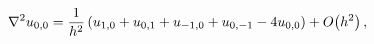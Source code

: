\[\nabla^{2}u_{0,0}=\frac{1}{h^{2}}\,(u_{1,0}+u_{0,1}+u_{-1,0}+u_{0,-1}-4u_{0,0}%
)+\mathop{O\/}\nolimits\!\left(h^{2}\right),\]